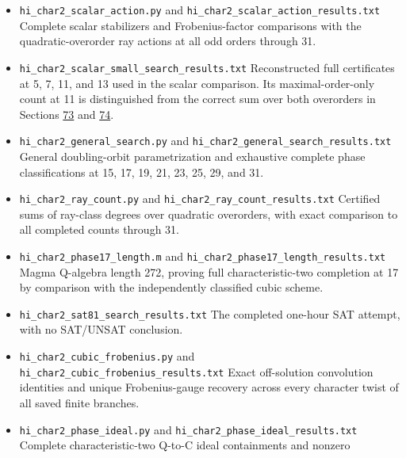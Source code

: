 \documentclass[11pt,reqno]{amsart}
\theoremstyle{plain}
\begin{document}
\begin{itemize}
\item \texttt{hi\_\allowbreak char2\_\allowbreak scalar\_\allowbreak action.py} and \texttt{hi\_\allowbreak char2\_\allowbreak scalar\_\allowbreak action\_\allowbreak results.txt}
Complete scalar stabilizers and Frobenius-factor comparisons with the
quadratic-overorder ray actions at all odd orders through 31.
\item \texttt{hi\_\allowbreak char2\_\allowbreak scalar\_\allowbreak small\_\allowbreak search\_\allowbreak results.txt}
Reconstructed full certificates at 5, 7, 11, and 13 used in the scalar
comparison. Its maximal-order-only count at 11 is distinguished from
the correct sum over both overorders in Sections \hyperref[sec:73]{73} and \hyperref[sec:74]{74}.
\item \texttt{hi\_\allowbreak char2\_\allowbreak general\_\allowbreak search.py} and \texttt{hi\_\allowbreak char2\_\allowbreak general\_\allowbreak search\_\allowbreak results.txt}
General doubling-orbit parametrization and exhaustive complete phase
classifications at 15, 17, 19, 21, 23, 25, 29, and 31.
\item \texttt{hi\_\allowbreak char2\_\allowbreak ray\_\allowbreak count.py} and \texttt{hi\_\allowbreak char2\_\allowbreak ray\_\allowbreak count\_\allowbreak results.txt}
Certified sums of ray-class degrees over quadratic overorders, with
exact comparison to all completed counts through 31.
\item \texttt{hi\_\allowbreak char2\_\allowbreak phase17\_\allowbreak length.m} and \texttt{hi\_\allowbreak char2\_\allowbreak phase17\_\allowbreak length\_\allowbreak results.txt}
Magma Q-algebra length 272, proving full characteristic-two completion
at 17 by comparison with the independently classified cubic scheme.
\item \texttt{hi\_\allowbreak char2\_\allowbreak sat81\_\allowbreak search\_\allowbreak results.txt}
The completed one-hour SAT attempt, with no SAT/UNSAT conclusion.
\item \texttt{hi\_\allowbreak char2\_\allowbreak cubic\_\allowbreak frobenius.py} and \texttt{hi\_\allowbreak char2\_\allowbreak cubic\_\allowbreak frobenius\_\allowbreak results.txt}
Exact off-solution convolution identities and unique Frobenius-gauge
recovery across every character twist of all saved finite branches.
\item \texttt{hi\_\allowbreak char2\_\allowbreak phase\_\allowbreak ideal.py} and \texttt{hi\_\allowbreak char2\_\allowbreak phase\_\allowbreak ideal\_\allowbreak results.txt}
Complete characteristic-two Q-to-C ideal containments and nonzero

\end{itemize}
\end{document}
